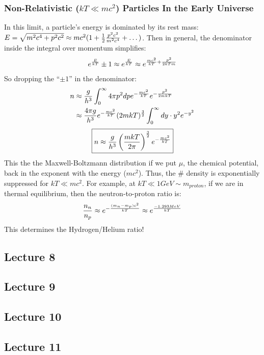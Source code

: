 \documentclass{article}
\def\hf{\frac12}
\def\hf{\frac12}
\begin{document}
\subsubsection*{ Non-Relativistic ($kT\ll mc^2$) Particles In the Early Universe }

In this limit, a particle's energy is dominated by its rest mass:
$E=\sqrt{m^2c^4+p^2c^2}\approx mc^2(1+\hf{p^2c^2\over m^2c^4}+\dots)$.  
Then in general, the denominator inside the integral over momentum simplifies:
\def\emckt{e^{-{mc^2\over kT}}}
$$e^{E\over kT}\pm 1\approx e^{E\over kT}\approx e^{{mc^2\over kT}+
{p^2\over 2kTm}}$$
So dropping the ``$\pm 1$'' in the denominator:
\begin{align}
n&\approx {g\over h^3}\int_0^\infty{4\pi p^2dpe^{-{mc^2\over kT}}
e^{-{p^2\over 2mkT}}}\\
&\approx{4\pi g\over h^3}\emckt(2mkT)^{3\over 2}\int_0^\infty{dy\cdot y^2
e^{-y^2}}\\
\end{align}
$$\boxed{n\approx{g\over h^3}\left({mkT\over 2\pi}\right)^{3\over 2}\emckt}$$
This the the Maxwell-Boltzmann distribution if we put $\mu$, the chemical
potential, back in the exponent with the energy ($mc^2$).  Thus, the \#
density is exponentially suppressed for $kT\ll mc^2$.  For example, at
$kT\ll 1GeV\sim m_{proton}$, if we are in thermal equilibrium, then the
neutron-to-proton ratio is:
$${n_n\over n_p}\approx e^{-{(m_n-m_p)c^2\over kT}}\approx e^{-1.293MeV\over
kT}$$
This determines the Hydrogen/Helium ratio!


\subsection{Lecture 8}

\subsection{Lecture 9}

\subsection{Lecture 10}

\subsection{Lecture 11}
\end{document}
